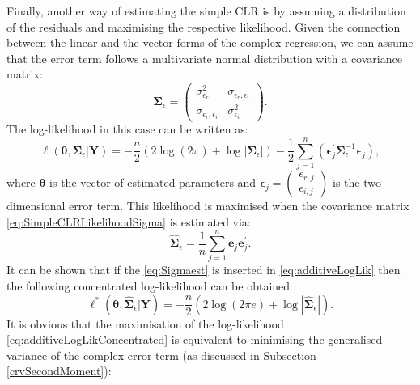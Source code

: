 \documentclass[
]{book}
\begin{document}
Finally, another way of estimating the simple CLR is by assuming a distribution of the residuals and maximising the respective likelihood. Given the connection between the linear and the vector forms of the complex regression, we can assume that the error term follows a multivariate normal distribution with a covariance matrix:
\begin{equation}
    \boldsymbol{\Sigma}_\epsilon = \begin{pmatrix} \sigma_{\epsilon_r}^2 & \sigma_{\epsilon_r, \epsilon_i} \\ \sigma_{\epsilon_r, \epsilon_i} & \sigma_{\epsilon_i}^2 \end{pmatrix} .
    \label{eq:SimpleCLRLikelihoodSigma}
\end{equation}
The log-likelihood in this case can be written as:
\begin{equation}
    \ell(\boldsymbol{\theta}, \boldsymbol{\Sigma}_\epsilon | \mathbf{Y}) = -\frac{n}{2} \left( 2 \log(2 \pi) + \log | \boldsymbol{\Sigma}_\epsilon| \right) -\frac{1}{2} \sum_{j=1}^n \left( \boldsymbol{\epsilon}_j^\prime \boldsymbol{\Sigma}_\epsilon^{-1} \boldsymbol{\epsilon}_j \right) ,
    \label{eq:additiveLogLik}
\end{equation}
where \(\boldsymbol{\theta}\) is the vector of estimated parameters and \(\boldsymbol{\epsilon}_j = \begin{pmatrix} \epsilon_{r,j} \\ \epsilon_{i,j} \end{pmatrix}\) is the two dimensional error term. This likelihood is maximised when the covariance matrix \eqref{eq:SimpleCLRLikelihoodSigma} is estimated via:
\begin{equation}
    \hat{\boldsymbol{\Sigma}}_\epsilon = \frac{1}{n} \sum_{j=1}^{n} \boldsymbol{e}_j \boldsymbol{e}_j^\prime .
    \label{eq:Sigmaest}
\end{equation}
It can be shown that if the \eqref{eq:Sigmaest} is inserted in \eqref{eq:additiveLogLik} then the following concentrated log-likelihood can be obtained \citep[see, for example,][]{Snyder2017}:
\begin{equation}
    \ell^*(\boldsymbol{\theta}, \hat{\boldsymbol{\Sigma}}_\epsilon | \mathbf{Y}) = -\frac{n}{2} \left( 2 \log(2 \pi e) + \log | \hat{\boldsymbol{\Sigma}}_\epsilon | \right) .
    \label{eq:additiveLogLikConcentrated}
\end{equation}
It is obvious that the maximisation of the log-likelihood \eqref{eq:additiveLogLikConcentrated} is equivalent to minimising the generalised variance of the complex error term (as discussed in Subsection \ref{crvSecondMoment}):
\end{document}
